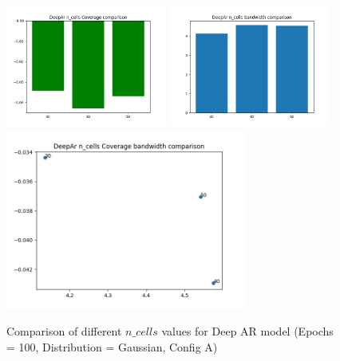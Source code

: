 \documentclass[a4paper, 12pt]{article}
\begin{document}
\begin{figure}[!h]
    \centering
    \includegraphics[width=200px]{plots/hist/a/DeepAr/n_cells/Coverage.png}
    \includegraphics[width=200px]{plots/hist/a/DeepAr/n_cells/bandwidth.png}
    \includegraphics[width=300px]{plots/scatter/a/DeepAr/n_cells/Coverage_bandwidth.png}
    \caption{Comparison of different $n\_cells$ values for Deep AR model (Epochs = 100, Distribution = Gaussian, Config A)}
    \label{fig:comp_deepar_n_cells}
\end{figure}
\end{document}
